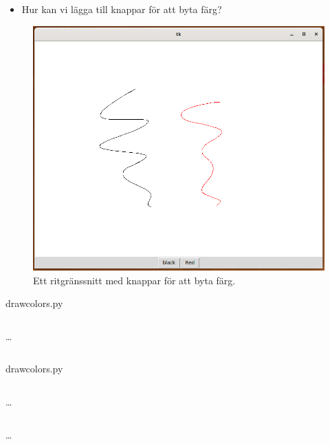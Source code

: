 \begin{frame}
  \begin{exercise}
    \begin{itemize}
      \item Hur kan vi lägga till knappar för att byta färg?
    \end{itemize}
  \end{exercise}
\end{frame}

\begin{frame}
  \begin{figure}
    \includegraphics[height=0.7\textheight]{figs/draw_colors.png}
    \caption{Ett ritgränssnitt med knappar för att byta färg.}
  \end{figure}
\end{frame}

\begin{frame}[fragile]
  draw\textunderscore colors.py \hrulefill
  \inputminted[linenos,firstline=5,lastline=7]{python}{examples/draw_colors.py}
  \dots
  \inputminted[autogobble=false,linenos,firstline=27,lastline=34]{python}{examples/draw_colors.py}
\end{frame}

\begin{frame}[fragile]
  draw\textunderscore colors.py \hrulefill
  \inputminted[autogobble=false,linenos,firstline=40,lastline=40]{python}{examples/draw_colors.py}
  \dots
  \inputminted[autogobble=false,linenos,firstline=49,lastline=52]{python}{examples/draw_colors.py}
  \dots
  \inputminted[autogobble=false,linenos,firstline=58,lastline=60]{python}{examples/draw_colors.py}
\end{frame}
